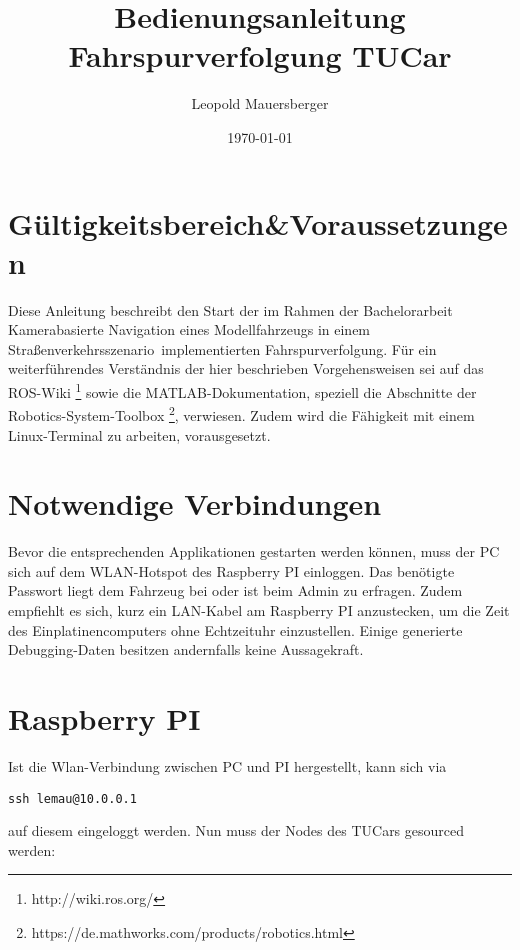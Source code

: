 \documentclass[
	11pt,			%
	a4paper,		%
	twoside,		%
	german,			%
	titlepage		%
]{scrartcl}			%
\title{\Large
	Bedienungsanleitung Fahrspurverfolgung TUCar
}
\author{Leopold Mauersberger}
\date{\today}
\begin{document}
\maketitle

\section{Gültigkeitsbereich\&Voraussetzungen}
Diese Anleitung beschreibt den Start der im Rahmen der Bachelorarbeit \glqq Kamerabasierte Navigation eines Modellfahrzeugs in einem Straßenverkehrsszenario\grqq\ implementierten Fahrspurverfolgung. Für ein weiterführendes Verständnis der hier beschrieben Vorgehensweisen sei auf das ROS-Wiki \footnote{http://wiki.ros.org/} sowie die MATLAB-Dokumentation, speziell die Abschnitte der Robotics-System-Toolbox \footnote{https://de.mathworks.com/products/robotics.html}, verwiesen. Zudem wird die Fähigkeit mit einem Linux-Terminal zu arbeiten, vorausgesetzt.

\section{Notwendige Verbindungen}
Bevor die entsprechenden Applikationen gestarten werden können, muss der PC sich auf dem WLAN-Hotspot des Raspberry PI einloggen. Das benötigte Passwort liegt dem Fahrzeug bei oder ist beim Admin zu erfragen. Zudem empfiehlt es sich, kurz ein LAN-Kabel am Raspberry PI anzustecken, um die Zeit des Einplatinencomputers ohne Echtzeituhr einzustellen. Einige generierte Debugging-Daten besitzen andernfalls keine Aussagekraft.

\section{Raspberry PI}
Ist die Wlan-Verbindung zwischen PC und PI hergestellt, kann sich via
\begin{verbatim}
ssh lemau@10.0.0.1
\end{verbatim}
auf diesem eingeloggt werden.
Nun muss der Nodes des TUCars gesourced werden:
\end{document}
